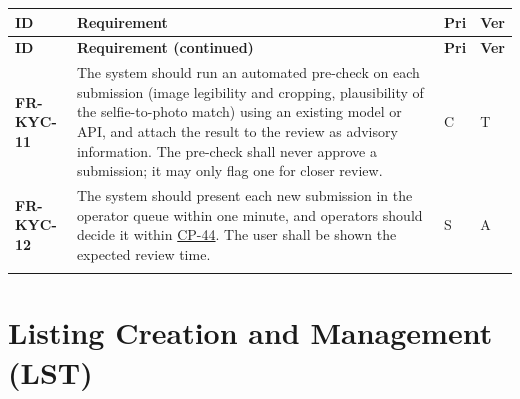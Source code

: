 \documentclass[11pt,a4paper]{report}
\makeatletter
\newenvironment{reqs}{%
  \small
  \begin{longtable}{@{}>{\raggedright\arraybackslash}p{2.35cm}
                       >{\raggedright\arraybackslash}p{10.3cm}
                       >{\centering\arraybackslash}p{0.7cm}
                       >{\centering\arraybackslash}p{0.7cm}@{}}
  \toprule
  \textbf{ID} & \textbf{Requirement} & \textbf{Pri} & \textbf{Ver} \\
  \midrule
  \endfirsthead
  \toprule
  \textbf{ID} & \textbf{Requirement (continued)} & \textbf{Pri} & \textbf{Ver} \\
  \midrule
  \endhead
  \bottomrule
  \endfoot
}{\end{longtable}}
\newcommand{\req}[5]{\leavevmode\textbf{#1}\hypertarget{#1}{} & #5 & #2 & #3 \\ \addlinespace[2pt]}
\newcommand{\cp}[1]{\hyperlink{#1}{#1}}
\makeatother
\begin{document}
\begin{reqs}
\req{FR-KYC-11}{C}{T}{proposal AI}{The system should run an automated pre-check on each submission (image legibility and cropping, plausibility of the selfie-to-photo match) using an existing model or API, and attach the result to the review as advisory information. The pre-check shall never approve a submission; it may only flag one for closer review.}
\req{FR-KYC-12}{S}{A}{new}{The system should present each new submission in the operator queue within one minute, and operators should decide it within \cp{CP-44}. The user shall be shown the expected review time.}
\end{reqs}

\section{Listing Creation and Management (LST)}
\end{document}
